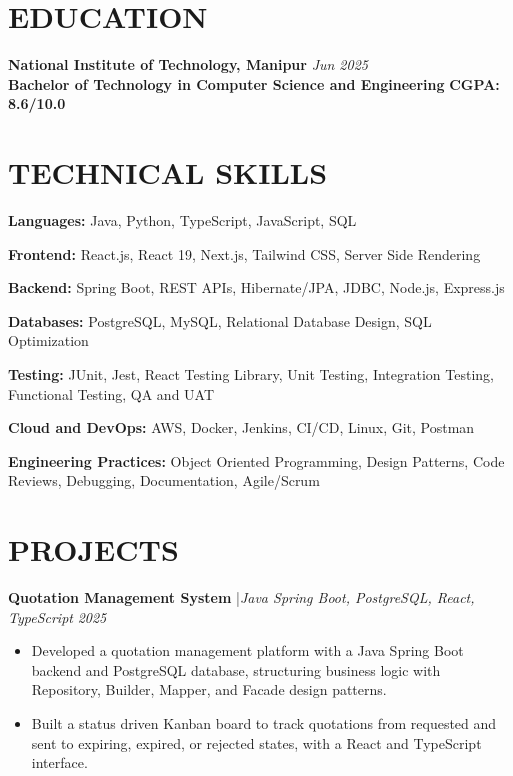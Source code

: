 \documentclass[a4paper,10pt]{article}
\newcommand{\projrow}[3]{%
    \noindent
    {\bfseries\color{dark}#1}%
    {\color{light}\enspace|\enspace\small\itshape #2}%
    \hfill{\small\color{light}\itshape #3}%
}
\newcommand{\skillrow}[2]{%
    \noindent
    {\bfseries\color{dark}#1:\enspace}%
    {\color{mid}#2}\par%
}
\begin{document}

\section{EDUCATION}

\noindent
{\bfseries\color{dark}National Institute of Technology, Manipur}
\hfill{\small\itshape Jun 2025}\\
{\bfseries Bachelor of Technology in Computer Science and Engineering}
\hfill{\bfseries\color{dark}CGPA: 8.6/10.0}


\section{TECHNICAL SKILLS}

\skillrow{Languages}{
Java, Python, TypeScript, JavaScript, SQL
}

\skillrow{Frontend}{
React.js, React 19, Next.js, Tailwind CSS, Server Side Rendering
}

\skillrow{Backend}{
Spring Boot, REST APIs, Hibernate/JPA, JDBC, Node.js, Express.js
}

\skillrow{Databases}{
PostgreSQL, MySQL, Relational Database Design, SQL Optimization
}

\skillrow{Testing}{
JUnit, Jest, React Testing Library, Unit Testing, Integration Testing,
Functional Testing, QA and UAT
}

\skillrow{Cloud and DevOps}{
AWS, Docker, Jenkins, CI/CD, Linux, Git, Postman
}

\skillrow{Engineering Practices}{
Object Oriented Programming, Design Patterns, Code Reviews,
Debugging, Documentation, Agile/Scrum
}


\section{PROJECTS}

\projrow{Quotation Management System}
{Java Spring Boot, PostgreSQL, React, TypeScript}{2025}

\vspace{2pt}

\begin{itemize}

\item Developed a quotation management platform with a Java Spring Boot
backend and PostgreSQL database, structuring business logic with
Repository, Builder, Mapper, and Facade design patterns.

\item Built a status driven Kanban board to track quotations from
requested and sent to expiring, expired, or rejected states, with a
React and TypeScript interface.

\end{itemize}
\end{document}
